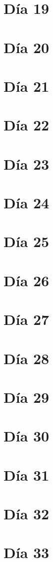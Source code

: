 \documentclass[11pt]{report}
\theoremstyle{plain}
\theoremstyle{definition}
\begin{document}
\section{Día 19}
\section{Día 20}
\section{Día 21}
\section{Día 22}
\section{Día 23}
\section{Día 24}
\section{Día 25}
\section{Día 26}
\section{Día 27}
\section{Día 28}
\section{Día 29}
\section{Día 30}
\section{Día 31}
\section{Día 32}
\section{Día 33}
\end{document}
